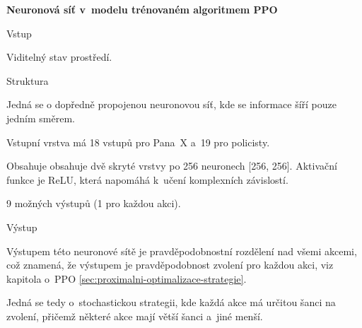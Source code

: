   \textbf{Neuronová síť v~modelu trénovaném algoritmem PPO}
    \begin{myitemize}
      \item Vstup
        \begin{myitemize}
          \item Viditelný stav prostředí.
        \end{myitemize}
      \item Struktura
        \begin{myitemize}
          \item Jedná se o dopředně propojenou neuronovou síť, kde se informace šíří pouze jedním směrem.
          \item Vstupní vrstva má 18 vstupů pro Pana~X a~19 pro policisty.
          \item Obsahuje obsahuje dvě skryté vrstvy po 256 neuronech [256, 256]. Aktivační funkce je ReLU, která napomáhá k~učení komplexních závislostí.
          \item 9 možných výstupů (1 pro každou akci).
        \end{myitemize}
      \item Výstup
        \begin{myitemize}
          \item Výstupem této neuronové sítě je pravděpodobnostní rozdělení nad všemi akcemi, což znamená, že výstupem je pravděpodobnost zvolení pro každou akci, viz kapitola o~PPO \ref{sec:proximalni-optimalizace-strategie}.
          \item Jedná se tedy o~stochastickou strategii, kde každá akce má určitou šanci na zvolení, přičemž některé akce mají větší šanci a~jiné menší.
        \end{myitemize}
    \end{myitemize}

